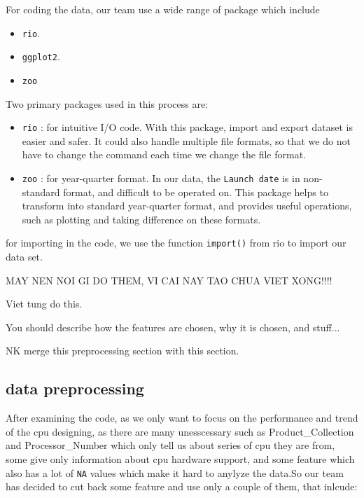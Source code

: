 For coding the data, our team use a wide range of package which include 
\begin{itemize}
    \item \verb|rio|.
    \item \verb|ggplot2|.
    \item \verb|zoo|
\end{itemize}

Two primary packages used in this process are:

\begin{itemize}
    \item \verb|rio| : for intuitive I/O code.
    With this package, import and export dataset is easier and safer. It could 
    also handle multiple file formats, so that we do not have to
    change the command each time we change the file format.

    \item \verb|zoo| : for year-quarter format.
    In our data, the \verb|Launch date| is in non-standard format, and difficult to be operated on. This package helps to transform
    into standard year-quarter format, and provides useful operations, such as plotting and taking difference on these formats.

\end{itemize}


for importing in the code, we use the function \texttt{import()} from rio to import our data set.


MAY NEN NOI GI DO THEM, VI CAI NAY TAO CHUA VIET XONG!!!!

Viet tung do this.

You should describe how the features are chosen, why it is chosen, and stuff...

NK merge this preprocessing section with this section.
\subsection{data preprocessing}

After examining the code, as we only want to focus on the performance and trend of the cpu designing, as there are many unesscessary such as Product\_Collection and Processor\_Number which only tell us about series of cpu they are from, some give only information about cpu hardware support, and some feature which also has a lot of \texttt{NA} values which make it hard to anylyze the data.So our team has decided to cut back some feature and use only a couple of them, that inlcude:

